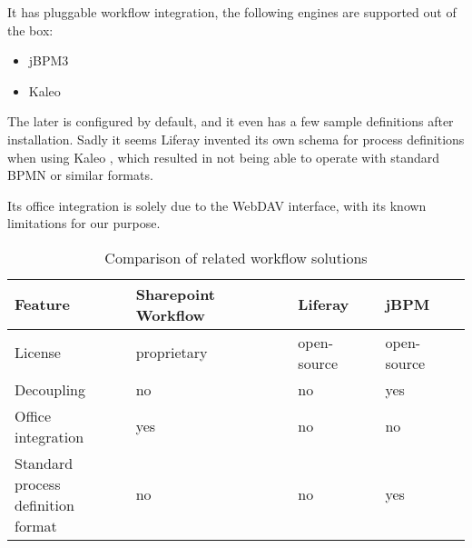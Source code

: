 It has pluggable workflow integration, the following engines are supported out of the box:

\begin{itemize}
\item jBPM3
\item Kaleo
\end{itemize}

The later is configured by default, and it even has a few sample definitions
after installation. Sadly it seems Liferay invented its own schema for process
definitions when using Kaleo \cite{liferay-kaleo}, which resulted in not being
able to operate with standard BPMN or similar formats.

Its office integration is solely due to the WebDAV interface, with its known
limitations for our purpose.

\begin{table}[H]
  \begin{center}
    \begin{tabular}{| l | l | l | l |}
    \hline
    \textbf{Feature} & \textbf{Sharepoint Workflow} & \textbf{Liferay} & \textbf{jBPM} \\ \hline
    License          & proprietary                  & open-source      & open-source \\ \hline
    Decoupling       & no                           & no               & yes \\ \hline
    Office integration & yes                        & no               & no \\ \hline
    \makecell[l]{Standard process \\ definition format} & no & no      & yes \\ \hline
    \end{tabular}
  \end{center}
  \caption{Comparison of related workflow solutions}
  \label{tab:related-wf-cmp}
\end{table}

